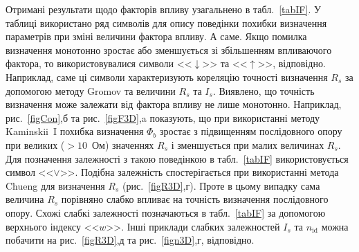 Отримані результати щодо факторів впливу узагальнено в табл.~\ref{tabIF}.
У таблиці використано ряд символів для опису поведінки похибки визначення параметрів при зміні величини фактора впливу.
А саме.
Якщо помилка визначення монотонно зростає або зменшується зі збільшенням впливаючого фактора, то використовувалися символи <<$\downarrow$>> та <<$\uparrow$>>, відповідно.
Наприклад, саме ці символи характеризують кореляцію точності визначення $R_s$ за допомогою методу Gromov та величини $R_s$ та $I_s$.
Виявлено, що точність визначення може залежати від фактора впливу не лише монотонно.
Наприклад, рис.~\ref{figCon},б та рис.~\ref{figF3D},a показують, що при використанні методу Kaminskii~I похибка визначення $\Phi_b$ зростає з підвищенням послідовного опору при великих ($>10$~Ом) значеннях $R_s$ і зменшується при малих величинах $R_s$.
Для позначення залежності з такою поведінкою в табл.~\ref{tabIF} використовується символ <<$\vee$>>.
Подібна залежність спостерігається при використанні метода Chueng для визначення $R_s$ (рис.~\ref{figR3D},г).
Проте в цьому випадку сама величина $R_s$ порівняно слабко впливає на точність визначення послідовного опору.
Схожі слабкі залежності позначаються в табл.~\ref{tabIF} за допомогою верхнього індексу  <<$w$>>.
Інші приклади слабких залежностей $I_s$ та  $n_\mathrm{id}$ можна побачити на рис.~\ref{figR3D},д та рис.~\ref{fign3D},г, відповідно.


